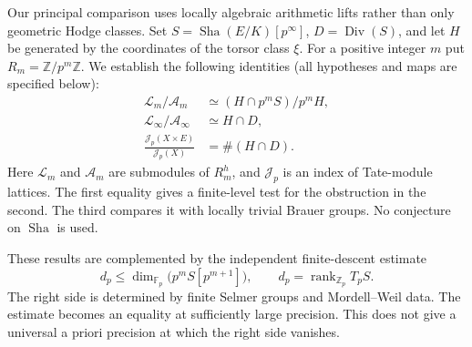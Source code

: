 \documentclass[11pt,a4paper]{article}
\theoremstyle{remark}\newtheorem{remark}[theorem]{Remark}
\newcommand{\Sha}{\mathop{\mathrm{Sha}}}\newcommand{\Pic}{\operatorname{Pic}}\newcommand{\Br}{\operatorname{Br}}\newcommand{\NS}{\operatorname{NS}}\newcommand{\Gal}{\operatorname{Gal}}\newcommand{\Hom}{\operatorname{Hom}}\newcommand{\Z}{\mathbb Z}\newcommand{\Q}{\mathbb Q}\newcommand{\F}{\mathbb F}\newcommand{\G}{\mathbb G}\newcommand{\coker}{\operatorname{coker}}\newcommand{\loc}{\operatorname{loc}}\newcommand{\et}{\mathrm{\acute et}}\newcommand{\Div}{\operatorname{Div}}\newcommand{\ord}{\operatorname{ord}}\newcommand{\im}{\operatorname{im}}\newcommand{\diag}{\operatorname{diag}}\newcommand{\rank}{\operatorname{rank}}\newcommand{\Sel}{\operatorname{Sel}}
\begin{document}
Our principal comparison uses locally algebraic arithmetic lifts rather than only geometric Hodge classes. Set $S=\Sha(E/K)[p^\infty]$, $D=\Div(S)$, and let $H$ be generated by the coordinates of the torsor class $\xi$. For a positive integer $m$ put $R_m=\Z/p^m\Z$. We establish the following identities (all hypotheses and maps are specified below):
\begin{align}
\mathcal L_m/\mathcal A_m&\simeq(H\cap p^mS)/p^mH,\label{mainfinite}\\
\mathcal L_\infty/\mathcal A_\infty&\simeq H\cap D,\label{maininfinite}\\
\frac{\mathcal J_p(X\times E)}{\mathcal J_p(X)}&=\#(H\cap D).\label{mainj}
\end{align}
Here $\mathcal L_m$ and $\mathcal A_m$ are submodules of $R_m^h$, and $\mathcal J_p$ is an index of Tate-module lattices. The first equality gives a finite-level test for the obstruction in the second. The third compares it with locally trivial Brauer groups. No conjecture on $\Sha$ is used.

These results are complemented by the independent finite-descent estimate
\begin{equation}\label{mainbound}
 d_p\le \dim_{\F_p}\bigl(p^m S[p^{m+1}]\bigr),\qquad d_p=\rank_{\Z_p}T_p S.
\end{equation}
The right side is determined by finite Selmer groups and Mordell--Weil data. The estimate becomes an equality at sufficiently large precision. This does not give a universal a priori precision at which the right side vanishes.
\end{document}
